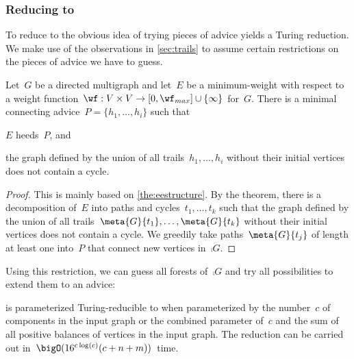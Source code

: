 \subsubsection{Reducing \pWMEEs{} to \pWMEECAs{}} To reduce \pWMEEs{} to \pWMEECAs{} the obvious idea of trying pieces of advice yields a Turing reduction. We make use of the observations in \autoref{sec:trails} to assume certain restrictions on the pieces of advice we have to guess.
\begin{lemma}\label{lem:adstructure}
Let~$G$ be a directed multigraph and let~$E$ be a minimum-weight \EE{} with respect to a weight function~$\wf: V \times V \rightarrow [0, \wf_{max}]\cup \{\infty\}$ for~$G$. There is a minimal connecting advice~$P = \{h_1, \ldots, h_i\}$ such that
\begin{lemenum}
\item $E$ heeds~$P$, and
\item the graph defined by the union of all trails~$h_1, \ldots, h_i$ without their initial vertices does not contain a cycle.
\end{lemenum}
\end{lemma}
\begin{proof}
  This is mainly based on \autoref{the:eestructure}. By the theorem, there is a decomposition of~$E$ into paths and cycles~$t_1, \ldots, t_k$ such that the graph defined by the union of all trails~$\meta{G}{t_1}, \ldots, \meta{G}{t_k}$ without their initial vertices does not contain a cycle. We greedily take paths~$\meta{G}{t_j}$ of length at least one into~$P$ that connect new vertices in~$\comp{G}$.
\end{proof}
Using this restriction, we can guess all forests of~$\comp{G}$ and try all possibilities to extend them to an advice:
\begin{lemma}\label{lem:redwmeetowmeea}
  \pWMEE{} is parameterized Turing-reducible to \pWMEECA{} when parameterized by the number~$c$ of components in the input graph or the combined parameter of~$c$ and the sum of all positive balances of vertices in the input graph. The reduction can be carried out in~$\bigO(16^{c\log(c)}(c + n + m))$~time.
\end{lemma}
